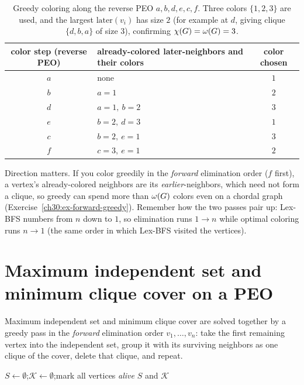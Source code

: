 \begin{table}[htbp]
\centering
\small
\begin{tabular}{c|l|c}
\toprule
color step (reverse PEO) & already-colored later-neighbors and their colors & color chosen \\
\midrule
$a$ & none & $1$ \\
$b$ & $a{=}1$ & $2$ \\
$d$ & $a{=}1,\ b{=}2$ & $3$ \\
$e$ & $b{=}2,\ d{=}3$ & $1$ \\
$c$ & $b{=}2,\ e{=}1$ & $3$ \\
$f$ & $c{=}3,\ e{=}1$ & $2$ \\
\bottomrule
\end{tabular}
\caption{Greedy coloring along the reverse PEO $a,b,d,e,c,f$. Three colors $\{1,2,3\}$ are used, and the largest $\mathrm{later}(v_i)$ has size $2$ (for example at $d$, giving clique $\{d,b,a\}$ of size $3$), confirming $\chi(G)=\omega(G)=3$.}
\label{ch30:tab-color}
\end{table}

\begin{trapbox}
Direction matters. If you color greedily in the \emph{forward} elimination order ($f$ first), a vertex's already-colored neighbors are its \emph{earlier}-neighbors, which need not form a clique, so greedy can spend more than $\omega(G)$ colors even on a chordal graph (Exercise~\ref{ch30:ex-forward-greedy}). Remember how the two passes pair up: Lex-BFS numbers from $n$ down to $1$, so elimination runs $1\to n$ while optimal coloring runs $n\to 1$ (the same order in which Lex-BFS visited the vertices).
\end{trapbox}

\section{Maximum independent set and minimum clique cover on a PEO}

Maximum independent set and minimum clique cover are solved together by a greedy pass in the \emph{forward} elimination order $v_1,\dots,v_n$: take the first remaining vertex into the independent set, group it with its surviving neighbors as one clique of the cover, delete that clique, and repeat.

\begin{algorithm}[H]
\caption{Maximum independent set and minimum clique cover from a PEO}
\label{ch30:alg-mis}
$S\leftarrow\emptyset$;\quad $\mathcal{K}\leftarrow\emptyset$;\quad mark all vertices \textit{alive}\;
\Return $S$ and $\mathcal{K}$\;
\end{algorithm}

